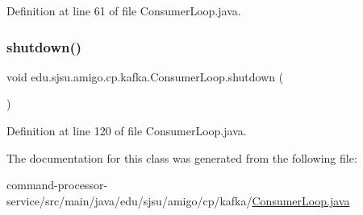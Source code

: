 Definition at line 61 of file Consumer\+Loop.\+java.

\mbox{\label{classedu_1_1sjsu_1_1amigo_1_1cp_1_1kafka_1_1_consumer_loop_adfc4a8e0be1d0a4c6ea3ddeb9bee0b87}} 
\subsubsection{\texorpdfstring{shutdown()}{shutdown()}}
{\footnotesize\ttfamily void edu.\+sjsu.\+amigo.\+cp.\+kafka.\+Consumer\+Loop.\+shutdown (\begin{DoxyParamCaption}{ }\end{DoxyParamCaption})}



Definition at line 120 of file Consumer\+Loop.\+java.



The documentation for this class was generated from the following file\+:\begin{DoxyCompactItemize}
\item 
command-\/processor-\/service/src/main/java/edu/sjsu/amigo/cp/kafka/\hyperlink{_consumer_loop_8java}{Consumer\+Loop.\+java}\end{DoxyCompactItemize}
